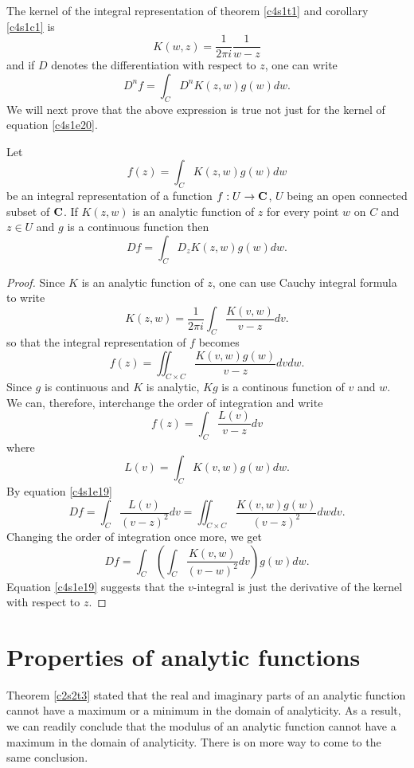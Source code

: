 The kernel of the integral representation of theorem \ref{c4s1t1} and
corollary \ref{c4s1c1} is
\begin{equation}\label{c4s1e20}
K(w, z) = \frac{1}{2\pi i}\frac{1}{w - z}
\end{equation}
and if $D$ denotes the differentiation with respect to $z$, one can write
\[
D^nf = \int_C D^n K(z, w) g(w)dw.
\]
We will next prove that the above expression is true not just for the kernel of
equation \eqref{c4s1e20}.

\begin{thm}\label{c4s1t5}
Let
\[
f(z) = \int_C K(z, w)g(w)dw
\]
be an integral representation of a function $f: U \rightarrow \mathbf{C}$, $U$
being an open connected subset of $\mathbf{C}$. If $K(z, w)$ is an analytic function 
of $z$ for every point $w$ on $C$ and $z \in U$ and $g$ is a continuous function
then
\[
Df = \int_C D_zK(z, w)g(w)dw.
\]
\end{thm}
\begin{proof}
Since $K$ is an analytic function of $z$, one can use Cauchy integral formula
to write
\[
K(z, w) = \frac{1}{2\pi i}\int_C \frac{K(v, w)}{v - z}dv.
\]
so that the integral representation of $f$ becomes
\[
f(z) = \iint_{C \times C} \frac{K(v, w)g(w)}{v - z}dvdw.
\]
Since $g$ is continuous and $K$ is analytic, $Kg$ is a continous function of
$v$ and $w$. We can, therefore, interchange the order of integration and write
\[
f(z) = \int_C \frac{L(v)}{v - z} dv
\]
where
\[
L(v) = \int_C K(v, w)g(w)dw.
\]
By equation \eqref{c4s1e19}
\[
Df = \int_C \frac{L(v)}{(v - z)^2} dv = \iint_{C \times C}
\frac{K(v, w)g(w)}{(v - z)^2} dwdv.
\]
Changing the order of integration once more, we get
\[
Df = \int_C \left(\int_C \frac{K(v, w)}{(v - w)^2} dv\right)g(w)dw.
\]
Equation \eqref{c4s1e19} suggests that the $v$-integral is just the derivative
of the kernel with respect to $z$.
\end{proof}

\section{Properties of analytic functions}\label{c4s2}
Theorem \ref{c2s2t3} stated that the real and imaginary parts of an analytic
function cannot have a maximum or a minimum in the domain of analyticity. As
a result, we can readily conclude that the modulus of an analytic function
cannot have a maximum in the domain of analyticity. There is on more way to
come to the same conclusion.

